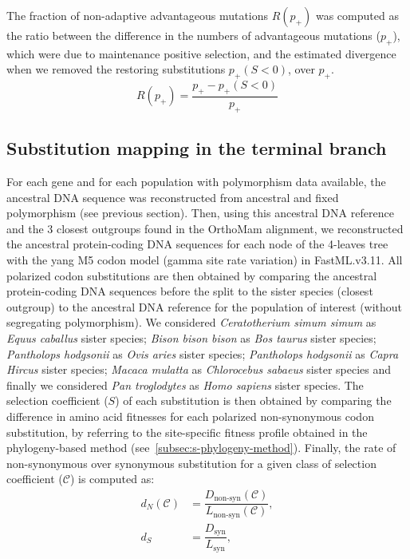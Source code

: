 \documentclass{article}
\newcommand{\dn}{d_N}
\newcommand{\ds}{d_S}
\newcommand{\Sphy}{S}
\newcommand{\Sphyclass}{\mathcal{C}}
\begin{document}
    The fraction of non-adaptive advantageous mutations $R(p_+)$ was computed as the ratio between the difference in the numbers of advantageous mutations ($p_+$), which were due to maintenance positive selection, and the estimated divergence when we removed the restoring substitutions $p_+(\Sphy < 0)$, over $p_+$.
    \begin{equation}
        R(p_+)=\dfrac{p_+ - p_+(\Sphy < 0)}{p_+}
    \end{equation}

    \subsection*{Substitution mapping in the terminal branch}
    \label{subsec:substitution-mapping-in-the-terminal-branch}
    For each gene and for each population with polymorphism data available, the ancestral DNA sequence was reconstructed from ancestral and fixed polymorphism (see previous section).
    Then, using this ancestral DNA reference and the $3$ closest outgroups found in the OrthoMam alignment, we reconstructed the ancestral protein-coding DNA sequences for each node of the 4-leaves tree with the yang M5 codon model (gamma site rate variation) in FastML.v3.11\cite{ashkenazy_fastml_2012}.
    All polarized codon substitutions are then obtained by comparing the ancestral protein-coding DNA sequences before the split to the sister species (closest outgroup) to the ancestral DNA reference for the population of interest (without segregating polymorphism).
    We considered \textit{Ceratotherium simum simum} as \textit{Equus caballus} sister species; \textit{Bison bison bison} as \textit{Bos taurus} sister species; \textit{Pantholops hodgsonii} as \textit{Ovis aries} sister species; \textit{Pantholops hodgsonii} as \textit{Capra Hircus} sister species; \textit{Macaca mulatta} as \textit{Chlorocebus sabaeus} sister species and finally we considered \textit{Pan troglodytes} as \textit{Homo sapiens} sister species.
    The selection coefficient ($\Sphy$) of each substitution is then obtained by comparing the difference in amino acid fitnesses for each polarized non-synonymous codon substitution, by referring to the site-specific fitness profile obtained in the phylogeny-based method (see~\ref{subsec:s-phylogeny-method}).
    Finally, the rate of non-synonymous over synonymous substitution for a given class of selection coefficient ($\Sphyclass$) is computed as:
    \begin{align}
        \dn \left( \Sphyclass \right) &= \dfrac{D_{\textrm{non-syn}}\left( \Sphyclass \right)}{L_{\textrm{non-syn}} \left( \Sphyclass \right)}, \\
        \ds &= \dfrac{D_{\textrm{syn}}}{L_{\textrm{syn}}},
    \end{align}
\end{document}
